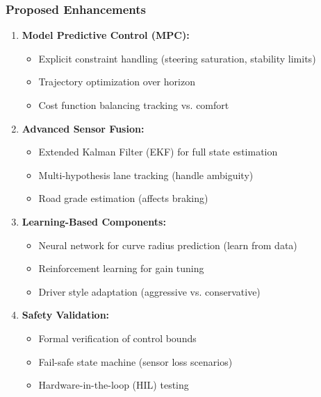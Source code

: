 \documentclass[12pt]{article}
\begin{document}
\subsubsection{Proposed Enhancements}
\begin{enumerate}
\item \textbf{Model Predictive Control (MPC):}
\begin{itemize}
\item Explicit constraint handling (steering saturation, stability limits)
\item Trajectory optimization over horizon
\item Cost function balancing tracking vs. comfort
\end{itemize}

\item \textbf{Advanced Sensor Fusion:}
\begin{itemize}
    \item Extended Kalman Filter (EKF) for full state estimation
    \item Multi-hypothesis lane tracking (handle ambiguity)
    \item Road grade estimation (affects braking)
\end{itemize}

\item \textbf{Learning-Based Components:}
\begin{itemize}
    \item Neural network for curve radius prediction (learn from data)
    \item Reinforcement learning for gain tuning
    \item Driver style adaptation (aggressive vs. conservative)
\end{itemize}

\item \textbf{Safety Validation:}
\begin{itemize}
    \item Formal verification of control bounds
    \item Fail-safe state machine (sensor loss scenarios)
    \item Hardware-in-the-loop (HIL) testing
\end{itemize}

\end{enumerate}
\end{document}
